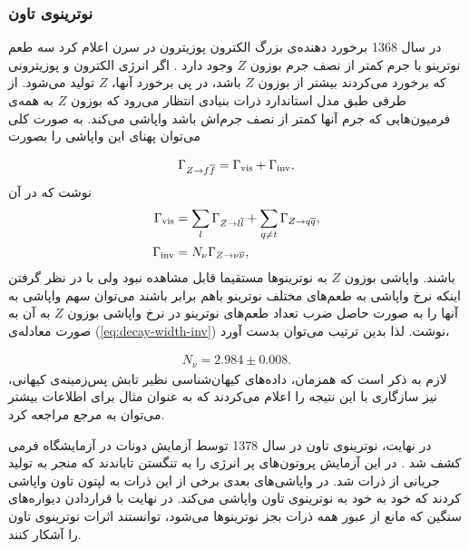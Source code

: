\documentclass[a4paper]{book}
\begin{document}
\subsubsection{نوترینوی تاون}
در سال 1368 برخورد دهنده‌ی بزرگ الکترون پوزیترون در سرن اعلام کرد سه طعم نوترینو با جرم کمتر از نصف جرم بوزون {\footnotesize$Z$} وجود دارد \cite{LEP}. اگر انرژی الکترون و پوزیترونی که برخورد می‌کردند بیشتر از بوزون {\footnotesize$Z$} باشد، در پی برخورد آنها، {\footnotesize$Z$} تولید می‌شود. از طرفی طبق مدل استاندارد ذرات بنیادی انتظار می‌رود که بوزون {\footnotesize$Z$} به همه‌ی فرمیون‌هایی که جرم آنها کمتر از نصف جرم‌اش باشد واپاشی می‌کند. به صورت کلی می‌توان پهنای این واپاشی را بصورت
\par
\vspace{-0.5cm}
{\footnotesize\begin{align}
	\Gamma_{Z \to f \overline{f}} = \Gamma_{\rm vis} + \Gamma_{\rm inv},
\end{align}}
نوشت که در آن
{\footnotesize\begin{align}
	\Gamma_{\rm vis} &= \sum_{l} \Gamma_{Z \to l \overline{l}} + \sum_{q \neq t} \Gamma_{Z \to q \overline{q}},\\
	\Gamma_{\rm inv} &= N_{\nu} \Gamma_{Z \to \nu \overline{\nu}},
	\label{eq:decay-width-inv}
\end{align}}
باشند. واپاشی بوزون {\footnotesize$Z$} به نوترینوها مستقیما قابل مشاهده نبود ولی با در نظر گرفتن اینکه نرخ واپاشی به طعم‌های مختلف نوترینو باهم برابر باشند می‌توان سهم واپاشی به آنها را به صورت حاصل ضرب تعداد طعم‌های نوترینو در نرخ واپاشی بوزون {\footnotesize$Z$} به آن به صورت معادله‌ی (\ref{eq:decay-width-inv}) نوشت. لذا بدین ترتیب می‌توان بدست آورد،
\par
\vspace{-0.5cm}
{\footnotesize\begin{align}
	N_{\nu} = 2.984 \pm 0.008.
\end{align}}
لازم به ذکر است که همزمان، داده‌های کیهان‌شناسی نظیر تابش پس‌زمینه‌ی کیهانی، نیز سازگاری با این نتیجه را اعلام می‌کردند که به عنوان مثال برای اطلاعات بیشتر می‌توان به مرجع \cite{Gerbino:2022nvz} مراجعه کرد.
		
در نهایت، نوترینوی تاون در سال 1378 توسط آزمایش دونات در آزمایشگاه فرمی کشف شد \cite{Fermilab}. در این آزمایش پروتون‌های پر انرژی را به تنگستن تاباندند که منجر به تولید جریانی از ذرات شد. در واپاشی‌های بعدی برخی از این ذرات به لپتون تاون واپاشی کردند که خود به خود به نوترینوی تاون واپاشی می‌کند. در نهایت با قراردادن دیواره‌های سنگین که مانع از عبور همه ذرات بجز نوترینوها می‌شود، توانستند اثرات نوترینوی تاون را آشکار کنند.
		
\end{document}
